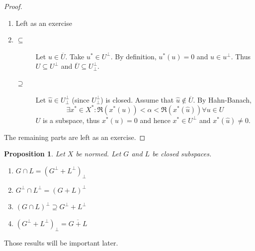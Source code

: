 \documentclass[a4paper]{article}
\newcounter{lecref}[section]
\numberwithin{lecref}{section}
\newtheorem{proposition}[lecref]{Proposition}
\begin{document}
\begin{proof}
	\begin{enumerate}
		\item Left as an exercise
		\item \begin{description}
			\item[$\subseteq$] Let $u \in \overline U$. Take $u^* \in U^\bot$.
				By definition, $u^*(u) = 0$ and $u \in u^\bot$. Thus $U \subseteq U^\bot$ and $\overline U \subseteq U^\bot_\bot$.
			\item[$\supseteq$] Let $\hat u \in U^\bot_\bot$ (since $U^\bot_\bot$) is closed.
				Assume that $\hat u \not\in \overline U$.
				By Hahn-Banach,
				\[ \exists x^* \in X^*: \Re(x^*(u)) < \alpha < \Re(x^*(\hat u)) \forall u \in U \] %
				$U$ is a subspace, thus $x^*(u) = 0$ and hence $x^* \in U^\bot$ and $x^*(\hat u) \neq 0$.
		\end{description}
	\end{enumerate}
	The remaining parts are left as an exercise.
\end{proof}

\begin{proposition}
	\label{proposition:7.10}
	Let $X$ be normed. Let $G$ and $L$ be closed subspaces.
	\begin{enumerate}
		\item $G \cap L = (G^\bot + L^\bot)_\bot$
		\item $G^\bot \cap L^\bot = (G + L)^\bot$
		\item $(G \cap L)^\bot \supseteq G^\bot + L^\bot$
		\item $(G^\bot + L^\bot)_\bot = \overline{G + L}$
	\end{enumerate}
\end{proposition}

Those results will be important later.
\end{document}
